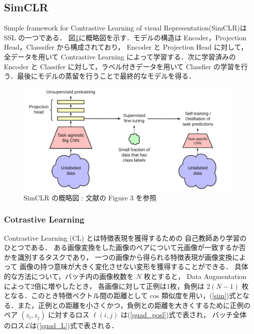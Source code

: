 \changeindent{0cm}
\subsection{SimCLR}
\changeindent{2cm}
Simple framework for Contrastive Learning of visual Representation(SimCLR)\cite{chen2020simple}は SSL の一つである．
図\ref{fig:SimCLR}に概略図を示す．モデルの構造は Encoder，Projection Head，Classsifer
から構成されており， Encoder と Projection Head に対して，全データを用いて Contrastive Learning によって学習する．次に学習済みの Encoder と Classifer に対して，ラベル付きデータを用いて Classfier の学習を行う．最後にモデルの蒸留を行うことで最終的なモデルを得る．

\begin{figure}[h]
	\begin{center}
		\includegraphics[scale=1.0]{./images/SimCLR.png}
		\caption[SimCLR の概略図]
		{SimCLR の概略図 : 文献\cite{chen2020big}の Figure 3 を参照\label{fig:SimCLR}}
	\end{center}
\end{figure}

\changeindent{0cm}
\subsubsection{Cotrastive Learning}
\changeindent{2cm}
Contrastive Learning (CL)\cite{tian2020makes} とは特徴表現を獲得するための
自己教師あり学習のひとつである．
ある画像変換をした画像のペアについて元画像が一致するか否かを識別するタスクであり，
一つの画像から得られる特徴表現が画像変換によって
画像の持つ意味が大きく変化させない変形を獲得することができる．
具体的な方法について，バッチ内の画像枚数を $N$ 枚とすると， Data Augmentation によって2倍に増やしたとき，
各画像に対して正例は1枚，負例は $2(N-1)$ 枚となる．このとき特徴ベクトル間の距離として cos 類似度を用い，(\ref{sim})式となる．また，正例との距離を小さくかつ，負例との距離を大きくするために正例のペア $(z_i,z_j)$ に対するロス $\ell(i, j)$ は(\ref{quad_posl})式で表され，
バッチ全体のロス$\mathcal L$は(\ref{quad_L})式で表される．

